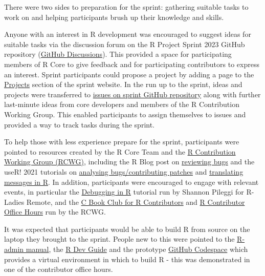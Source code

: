 There were two sides to preparation for the sprint: gathering suitable tasks to
work on and helping participants brush up their knowledge and skills.

Anyone with an interest in R development was encouraged to suggest ideas for
suitable tasks via the discussion forum on the R Project Sprint 2023 GitHub
repository (\href{https://github.com/r-devel/r-project-sprint-2023/discussions/categories/ideas}{GitHub Discussions}). This provided a space for participating members of R Core to give
feedback and for participating contributors to express an interest. Sprint
participants could propose a project by adding a page to the \href{https://contributor.r-project.org/r-project-sprint-2023/projects/}{Projects}
section of the sprint website. In the run up to the sprint, ideas and projects
were transferred to \href{https://github.com/r-devel/r-project-sprint-2023/issues}{issues on sprint GitHub repository}
along with further last-minute ideas from core developers and members of the R
Contribution Working Group. This enabled participants to assign themselves to
issues and provided a way to track tasks during the sprint.

To help those with less experience prepare for the sprint, participants were
pointed to resources created by the R Core Team and the
\href{https://contributor.r-project.org/working-group}{R Contribution Working Group (RCWG)},
including the R Blog post on \href{https://blog.r-project.org/2019/10/09/r-can-use-your-help-reviewing-bug-reports/index.html}{reviewing bugs} and
the useR! 2021 tutorials on \href{https://contributor.r-project.org/tutorials/contributing-to-r/}{analysing bugs/contributing patches} and
\href{https://contributor.r-project.org/tutorials/translating-r-to-your-language/}{translating messages in R}. In addition, participants were encouraged to engage with relevant events,
in particular the \href{https://youtu.be/179x00KGd9M}{Debugging in R} tutorial run
by Shannon Pileggi for R-Ladies Remote, and the \href{https://contributor.r-project.org/events/c-book-club-2023/}{C Book Club for R Contributors} and
\href{https://contributor.r-project.org/events/office-hours/}{R Contributor Office Hours}
run by the RCWG.

It was expected that participants would be able to build R from source on the
laptop they brought to the sprint. People new to this were pointed to the
\href{https://cran.r-project.org/doc/manuals/r-devel/R-admin.html}{R-admin manual},
the \href{https://contributor.r-project.org/rdevguide/}{R Dev Guide} and the
prototype \href{https://github.com/r-devel/r-dev-env/}{GitHub Codespace} which
provides a virtual environment in which to build R - this was demonstrated in
one of the contributor office hours.

